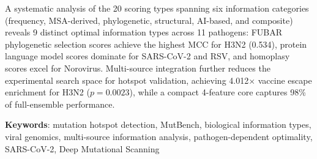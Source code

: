 A systematic analysis of the 20 scoring types spanning six information categories (frequency, MSA-derived, phylogenetic, structural, AI-based, and composite) reveals 9 distinct optimal information types across 11 pathogens: FUBAR phylogenetic selection scores achieve the highest MCC for H3N2 (0.534), protein language model scores dominate for SARS-CoV-2 and RSV, and homoplasy scores excel for Norovirus.
Multi-source integration further reduces the experimental search space for hotspot validation, achieving 4.012$\times$ vaccine escape enrichment for H3N2 ($p = 0.0023$), while a compact 4-feature core captures 98\% of full-ensemble performance.

\vspace{1em}
\noindent\textbf{Keywords}: mutation hotspot detection, MutBench, biological information types, viral genomics, multi-source information analysis, pathogen-dependent optimality, SARS-CoV-2, Deep Mutational Scanning
